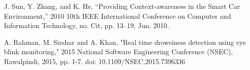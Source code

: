 \documentclass[twocolumn]{article}
\begin{document}
\begin{thebibliography}{1}
     J. Sun, Y. Zhang, and K. He, “Providing Context-awareness in the Smart Car Environment,” 2010 10th IEEE International Conference on Computer and Information Technology, no. Cit, pp. 13–19, Jun. 2010.

	A. Rahman, M. Sirshar and A. Khan, "Real time drowsiness detection using eye blink monitoring," 2015 National Software Engineering Conference (NSEC), Rawalpindi, 2015, pp. 1-7.
doi: 10.1109/NSEC.2015.7396336

  \end{thebibliography}
\end{document}
